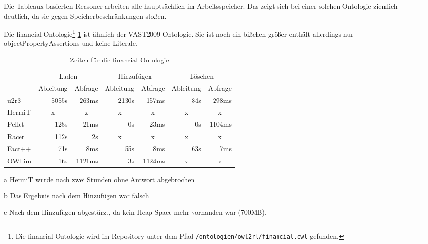 Die Tableaux-basierten Reasoner arbeiten alle hauptsächlich im Arbeitsspeicher. Das zeigt sich bei einer solchen Ontologie ziemlich deutlich, da sie gegen Speicherbeschränkungen stoßen.

Die financial-Ontologie\footnote{Die financial-Ontologie wird im Repository unter dem Pfad \texttt{/ontologien/owl2rl/financial.owl} gefunden.} \ref{table-time-financial} ist ähnlich der VAST2009-Ontologie. Sie ist noch ein bißchen größer enthält allerdings nur objectPropertyAssertions und keine Literale.

\begin{table}[htbp]
\caption{Zeiten für die financial-Ontologie}
\label{table-time-financial}
\begin{center}
\begin{threeparttable}
\begin{tabular}{l|r|r|r|r|r|r|}
\cline{2-7}
 & \multicolumn{2}{|c|}{Laden} & \multicolumn{2}{|c|}{Hinzufügen} & \multicolumn{2}{|c|}{Löschen} \\
\cline{2-7}
 & \multicolumn{1}{|c|}{Ableitung} & \multicolumn{1}{|c|}{Abfrage} & \multicolumn{1}{|c|}{Ableitung} & \multicolumn{1}{|c|}{Abfrage} & \multicolumn{1}{|c|}{Ableitung} & \multicolumn{1}{|c|}{Abfrage} \\
\hline
\multicolumn{1}{|l|}{u2r3} & 5055s & 263ms & 2130s & 157ms & 84s & 298ms \\ \hline
\multicolumn{1}{|l|}{HermiT\tnote{a}} & \multicolumn{1}{c|}{x} & \multicolumn{1}{c|}{x} & \multicolumn{1}{c|}{x} & \multicolumn{1}{c|}{x} & \multicolumn{1}{c|}{x} & \multicolumn{1}{c|}{x} \\ \hline
\multicolumn{1}{|l|}{Pellet\tnote{b}} & 128s & 21ms & 0s & 23ms & 0s & 1104ms \\ \hline
\multicolumn{1}{|l|}{Racer\tnote{c}} & 112s & 2s & \multicolumn{1}{c|}{x} & \multicolumn{1}{c|}{x} & \multicolumn{1}{c|}{x} & \multicolumn{1}{c|}{x} \\ \hline
\multicolumn{1}{|l|}{Fact++} & 71s & 8ms & 55s & 8ms & 63s & 7ms \\ \hline
\multicolumn{1}{|l|}{OWLim} & 16s & 1121ms & 3s & 1124ms & \multicolumn{1}{c|}{x} & \multicolumn{1}{c|}{x} \\ \hline
\end{tabular}
\begin{tablenotes}
	\item[a] HermiT wurde nach zwei Stunden ohne Antwort abgebrochen
	\item[b] Das Ergebnis nach dem Hinzufügen war falsch
	\item[c] Nach dem Hinzufügen abgestürzt, da kein Heap-Space mehr vorhanden war (700MB).
\end{tablenotes}
\end{threeparttable}
\end{center}
\end{table}


